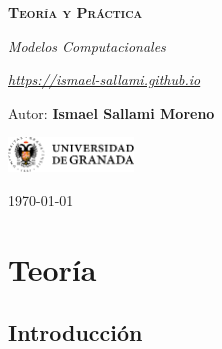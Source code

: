 \documentclass[12pt]{report} %
\begin{document}
\begin{titlepage}
    \begin{center}
        \vspace*{2cm}
        
        {\Huge \bfseries\scshape Teoría y Práctica \par}
        \vspace{0.5cm}
        {\Large \itshape Modelos Computacionales \par}
        \vspace{0.5cm}
        {\Large \itshape \href{https://ismael-sallami.github.io}{https://ismael-sallami.github.io} \par}


        \vfill
        
        {\LARGE Autor: \textbf{Ismael Sallami Moreno} \par}
        \vspace{0.3cm}
        
        \vspace{1cm}
        \includegraphics[width=0.25\textwidth]{../../../extraFiles/img/ugr.png} %
        \vspace{1cm}
        
        {\large \today}
    \end{center}
    
    \restoregeometry
\end{titlepage}


\thispagestyle{empty} %
\clearpage

\tableofcontents
\thispagestyle{empty} %
\clearpage

\part{Teoría}

\hypertarget{introducciuxf3n}{%
\chapter{Introducción}\label{introducciuxf3n}}
\end{document}
